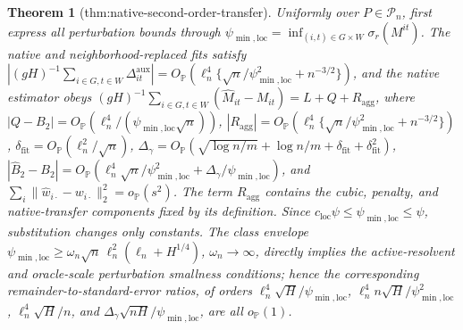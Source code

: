 \documentclass{article}
\newtheorem{theorem}{Theorem}
\begin{document}
\begin{theorem}[thm:native-second-order-transfer]\label{thm:native-second-order-transfer}
Uniformly over \(P\in\mathcal P_n\), first express all perturbation bounds through \(\psi_{\min,\mathrm{loc}}=\inf_{(i,t)\in G\times W}\sigma_r(M^{it})\). The native and neighborhood-replaced fits satisfy \(|(gH)^{-1}\sum_{i\in G,t\in W}\Delta^{\mathrm{aux}}_{it}|=O_{\mathbb P}(\ell_n^4\{\sqrt n/\psi_{\min,\mathrm{loc}}^2+n^{-3/2}\})\), and the native estimator obeys \((gH)^{-1}\sum_{i\in G,t\in W}(\widehat M_{it}-M_{it})=L+Q+R_{\mathrm{agg}}\), where \(|Q-B_2|=O_{\mathbb P}(\ell_n^4/(\psi_{\min,\mathrm{loc}}\sqrt n))\), \(|R_{\mathrm{agg}}|=O_{\mathbb P}(\ell_n^4\{\sqrt n/\psi_{\min,\mathrm{loc}}^2+n^{-3/2}\})\), \(\delta_{\mathrm{fit}}=O_{\mathbb P}(\ell_n^2/\sqrt n)\), \(\Delta_\gamma=O_{\mathbb P}(\sqrt{\log n/m}+\log n/m+\delta_{\mathrm{fit}}+\delta_{\mathrm{fit}}^2)\), \(|\widehat B_2-B_2|=O_{\mathbb P}(\ell_n^4\sqrt n/\psi_{\min,\mathrm{loc}}^2+\Delta_\gamma/\psi_{\min,\mathrm{loc}})\), and \(\sum_i\|\widehat w_{i\cdot}-w_{i\cdot}\|_2^2=o_{\mathbb P}(s^2)\). The term \(R_{\mathrm{agg}}\) contains the cubic, penalty, and native-transfer components fixed by its definition. Since \(c_{\mathrm{loc}}\psi\le\psi_{\min,\mathrm{loc}}\le\psi\), substitution changes only constants. The class envelope \(\psi_{\min,\mathrm{loc}}\ge\omega_n\sqrt n\,\ell_n^2(\ell_n+H^{1/4})\), \(\omega_n\to\infty\), directly implies the active-resolvent and oracle-scale perturbation smallness conditions; hence the corresponding remainder-to-standard-error ratios, of orders \(\ell_n^4\sqrt H/\psi_{\min,\mathrm{loc}}\), \(\ell_n^4n\sqrt H/\psi_{\min,\mathrm{loc}}^2\), \(\ell_n^4\sqrt H/n\), and \(\Delta_\gamma\sqrt{nH}/\psi_{\min,\mathrm{loc}}\), are all \(o_{\mathbb P}(1)\).
\end{theorem}
\end{document}
